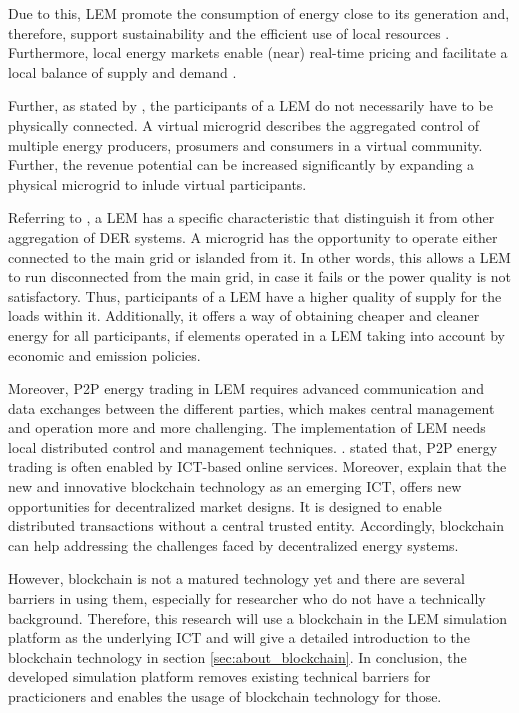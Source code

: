 Due to this, LEM promote the consumption of energy close to its generation and, therefore, 
support sustainability and the efficient use of local resources .
Furthermore, local energy markets enable (near) real-time pricing and facilitate a local balance
of supply and demand . 

Further, as stated by ,
the participants of a LEM do not necessarily have to be physically connected. A virtual microgrid
describes the aggregated control of multiple energy producers, prosumers and consumers in a virtual 
community. Further, the revenue potential can be increased significantly by expanding a physical 
microgrid to inlude virtual participants. 

Referring to , a LEM has a specific characteristic
that distinguish it from other aggregation of DER systems. A microgrid has the opportunity
to operate either connected to the main grid or islanded from it. In other words,
this allows a LEM to run disconnected from the main grid, in case it fails or 
the power quality is not satisfactory. Thus, participants of a LEM have a higher quality 
of supply for the loads within it. Additionally, it offers a way of obtaining cheaper 
and cleaner energy for all participants, if elements operated in a LEM taking into 
account by economic and emission policies.

Moreover, P2P energy trading in LEM requires advanced communication and data 
exchanges between the different parties, which makes central management and 
operation more and more challenging. The implementation of LEM needs 
local distributed control and management techniques. . 
 stated that, P2P energy trading is often
enabled by ICT-based online services. Moreover,  explain that 
the new and innovative blockchain technology as an emerging ICT, 
offers new opportunities for decentralized market designs.
It is designed to enable distributed transactions without 
a central trusted entity.
Accordingly, blockchain can help addressing the challenges faced by 
decentralized energy systems. 

However, blockchain is not a matured technology 
yet and there are several barriers in using them, especially 
for researcher who do not have a technically background. Therefore, this research 
will use a blockchain in the LEM simulation platform as the underlying ICT and will give a
detailed introduction to the blockchain technology in section \ref{sec:about_blockchain}.
In conclusion, the developed simulation platform removes existing technical barriers 
for practicioners and enables the usage of blockchain technology for those.

